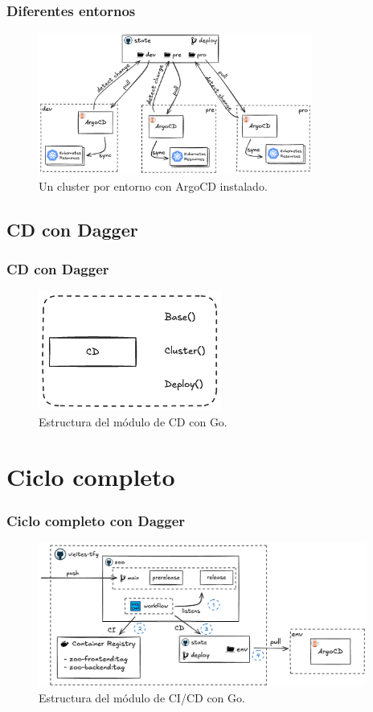 \documentclass{beamer}
\begin{document}
\begin{frame}
    \frametitle{Diferentes entornos}
    \begin{figure}
        \includegraphics[width=9cm]{figuras/clusters}
        \caption{Un cluster por entorno con ArgoCD instalado.}
    \end{figure}
\end{frame}

\subsection{CD con Dagger}
\begin{frame}
    \frametitle{CD con Dagger}
    \begin{figure}
        \includegraphics[width=6cm]{figuras/cd_dagger_go}
        \caption{Estructura del módulo de CD con Go.}
    \end{figure}
\end{frame}

\section{Ciclo completo}
\begin{frame}
    \frametitle{Ciclo completo con Dagger}
    \begin{figure}
        \includegraphics[width=10.8cm]{figuras/promotion}
        \caption{Estructura del módulo de CI/CD con Go.}
    \end{figure}
\end{frame}
\end{document}
